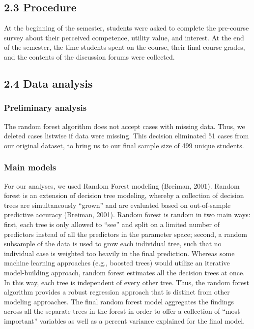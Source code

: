 \documentclass[acmart]{apa6}
\theoremstyle{definition}
\theoremstyle{definition}
\theoremstyle{definition}
\theoremstyle{remark}
\begin{document}
\subsection{2.3 Procedure}\label{procedure}

At the beginning of the semester, students were asked to complete the
pre-course survey about their perceived competence, utility value, and
interest. At the end of the semester, the time students spent on the
course, their final course grades, and the contents of the discussion
forums were collected.

\subsection{2.4 Data analysis}\label{data-analysis}

\subsubsection{Preliminary analysis}\label{preliminary-analysis}

The random forest algorithm does not accept cases with missing data.
Thus, we deleted cases listwise if data were missing. This decision
eliminated 51 cases from our original dataset, to bring us to our final
sample size of 499 unique students.

\subsubsection{Main models}\label{main-models}

For our analyses, we used Random Forest modeling (Breiman, 2001). Random
forest is an extension of decision tree modeling, whereby a collection
of decision trees are simultaneously \enquote{grown} and are evaluated
based on out-of-sample predictive accuracy (Breiman, 2001). Random
forest is random in two main ways: first, each tree is only allowed to
\enquote{see} and split on a limited number of predictors instead of all
the predictors in the parameter space; second, a random subsample of the
data is used to grow each individual tree, such that no individual case
is weighted too heavily in the final prediction. Whereas some machine
learning approaches (e.g., boosted trees) would utilize an iterative
model-building approach, random forest estimates all the decision trees
at once. In this way, each tree is independent of every other tree.
Thus, the random forest algorithm provides a robust regression approach
that is distinct from other modeling approaches. The final random forest
model aggregates the findings across all the separate trees in the
forest in order to offer a collection of \enquote{most important}
variables as well as a percent variance explained for the final model.
\end{document}
